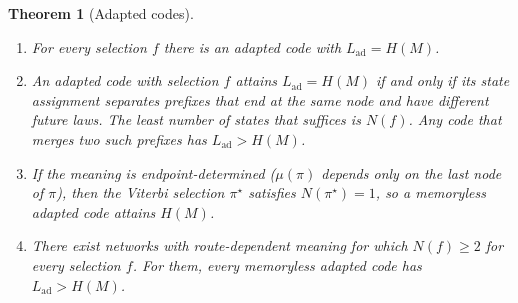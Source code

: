 \documentclass[11pt]{article}
\newtheorem{theorem}{Theorem}
\theoremstyle{definition}
\theoremstyle{remark}
\begin{document}
\begin{theorem}[Adapted codes]\label{thm:adapted}
\begin{enumerate}
\item[(a)] For every selection $f$ there is an adapted code with $L_{\mathrm{ad}}=H(M)$.
\item[(b)] An adapted code with selection $f$ attains $L_{\mathrm{ad}}=H(M)$ if and only if its state assignment separates prefixes that end at the same node and have different future laws. The least number of states that suffices is $N(f)$. Any code that merges two such prefixes has $L_{\mathrm{ad}}>H(M)$.
\item[(c)] If the meaning is \emph{endpoint-determined} ($\mu(\pi)$ depends only on the last node of $\pi$), then the Viterbi selection $\pi^\star$ satisfies $N(\pi^\star)=1$, so a memoryless adapted code attains $H(M)$.
\item[(d)] There exist networks with route-dependent meaning for which $N(f)\ge2$ for every selection $f$. For them, every memoryless adapted code has $L_{\mathrm{ad}}>H(M)$.
\end{enumerate}
\end{theorem}
\end{document}
